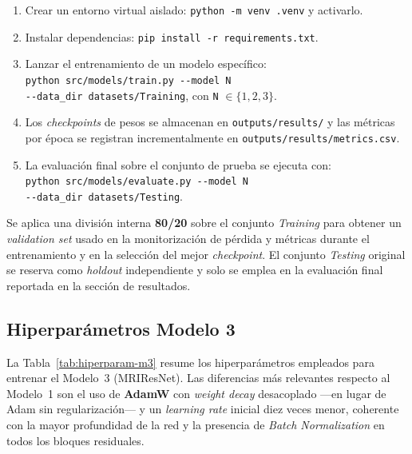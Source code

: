 \begin{enumerate}
  \item Crear un entorno virtual aislado:
        \texttt{python -m venv .venv} y activarlo.
  \item Instalar dependencias:
        \texttt{pip install -r requirements.txt}.
  \item Lanzar el entrenamiento de un modelo específico:\\
        \texttt{python src/models/train.py -{}-model N\\
        -{}-data\_dir datasets/Training},
        con \texttt{N} $\in \{1, 2, 3\}$.
  \item Los \textit{checkpoints} de pesos se almacenan en
        \texttt{outputs/results/} y las métricas por época se
        registran incrementalmente en
        \texttt{outputs/results/metrics.csv}.
  \item La evaluación final sobre el conjunto de prueba se
        ejecuta con:\\
        \texttt{python src/models/evaluate.py -{}-model N\\
        -{}-data\_dir datasets/Testing}.
\end{enumerate}

Se aplica una división interna \textbf{80/20} sobre el conjunto
\textit{Training} para obtener un \textit{validation set} usado
en la monitorización de pérdida y métricas durante el
entrenamiento y en la selección del mejor \textit{checkpoint}.
El conjunto \textit{Testing} original se reserva como
\textit{holdout} independiente y solo se emplea en la evaluación
final reportada en la sección de resultados.

\subsection{Hiperparámetros Modelo 3}
\label{sec:hiperparam-m3}

La Tabla~\ref{tab:hiperparam-m3} resume los hiperparámetros
empleados para entrenar el Modelo~3 (MRIResNet).
Las diferencias más relevantes respecto al Modelo~1 son el uso
de \textbf{AdamW} con \textit{weight decay} desacoplado ---en
lugar de Adam sin regularización--- y un \textit{learning rate}
inicial diez veces menor, coherente con la mayor profundidad de la
red y la presencia de \textit{Batch Normalization} en todos los
bloques residuales.


